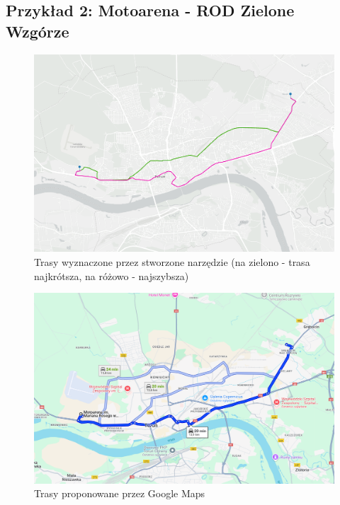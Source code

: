 \documentclass{article}
\begin{document}
\subsection{Przykład 2: Motoarena - ROD Zielone Wzgórze}
\begin{figure}[H]
    \centering
    \includegraphics[width=1\textwidth]{img/motoarena-rod.png}
    \caption{Trasy wyznaczone przez stworzone narzędzie (na zielono - trasa najkrótsza, na różowo - najszybsza)}
\end{figure}

\begin{figure}[H]
    \centering
    \includegraphics[width=1\textwidth]{img/motoarena-rod-google.png}
    \caption{Trasy proponowane przez Google Maps}
\end{figure}
\end{document}

